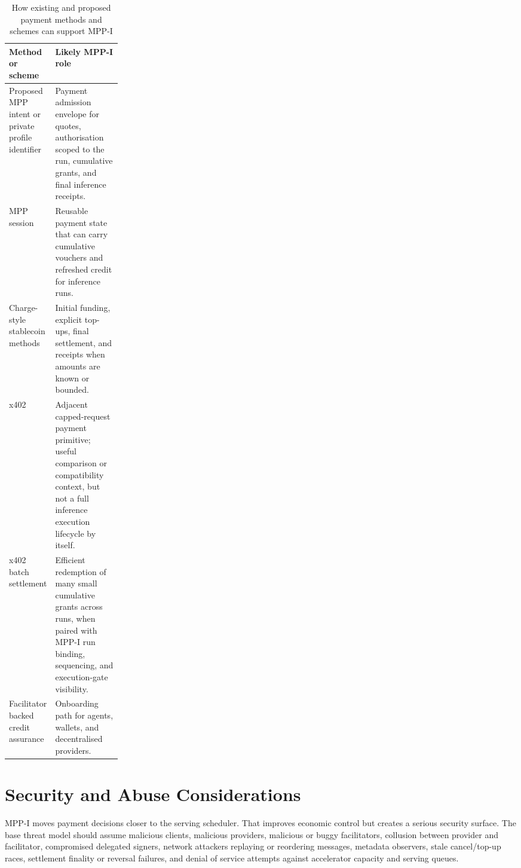 \documentclass[11pt]{article}
\newcommand{\field}[1]{\texttt{\detokenize{#1}}}
\newcommand{\mppi}{MPP-I}
\begin{document}
\begin{table}[htbp]
\centering
\caption{How existing and proposed payment methods and schemes can support \mppi{}}
\label{tab:compatibility-mapping}
\begin{tabularx}{\linewidth}{>{\raggedright\arraybackslash}p{0.22\linewidth} >{\raggedright\arraybackslash}X}
\toprule
\textbf{Method or scheme} & \textbf{Likely \mppi{} role} \\
\midrule
Proposed MPP \field{inference} intent or private profile identifier & Payment admission envelope for quotes, authorisation scoped to the run, cumulative grants, and final inference receipts. \\
MPP session & Reusable payment state that can carry cumulative vouchers and refreshed credit for inference runs. \\
Charge-style stablecoin methods & Initial funding, explicit top-ups, final settlement, and receipts when amounts are known or bounded. \\
x402 \field{upto} & Adjacent capped-request payment primitive; useful comparison or compatibility context, but not a full inference execution lifecycle by itself. \\
x402 batch settlement & Efficient redemption of many small cumulative grants across runs, when paired with \mppi{} run binding, sequencing, and execution-gate visibility. \\
Facilitator backed credit assurance & Onboarding path for agents, wallets, and decentralised providers. \\
\bottomrule
\end{tabularx}
\end{table}

\section{Security and Abuse Considerations}

\mppi{} moves payment decisions closer to the serving scheduler. That improves economic control but creates a serious security surface. The base threat model should assume malicious clients, malicious providers, malicious or buggy facilitators, collusion between provider and facilitator, compromised delegated signers, network attackers replaying or reordering messages, metadata observers, stale cancel/top-up races, settlement finality or reversal failures, and denial of service attempts against accelerator capacity and serving queues.
\end{document}
